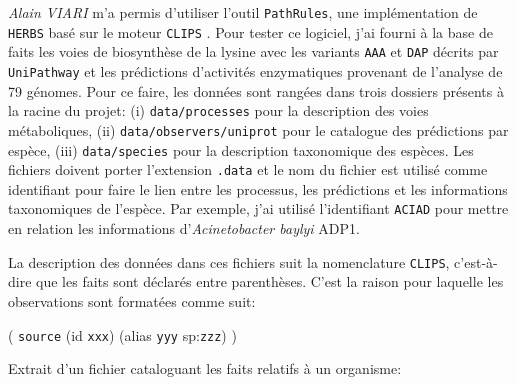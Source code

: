 \begin{refsegment}
\textit{Alain VIARI} m'a permis d'utiliser l'outil \texttt{PathRules}, une implémentation de \texttt{\gls{HERBS}} basé sur le moteur \texttt{\gls{CLIPS}} \cite{riley1991clips}. Pour tester ce logiciel, j'ai fourni à la base de faits les voies de biosynthèse de la lysine avec les variants \texttt{AAA} et \texttt{DAP} décrits par \texttt{UniPathway} et les prédictions d'activités enzymatiques provenant de l'analyse de 79 génomes. Pour ce faire, les données sont rangées dans trois dossiers présents à la racine du projet: (i) \texttt{data/processes} pour la description des voies métaboliques, (ii) \texttt{data/observers/uniprot} pour le catalogue des prédictions par espèce, (iii) \texttt{data/species} pour la description taxonomique des espèces. Les fichiers doivent porter l'extension \texttt{.data} et le nom du fichier est utilisé comme identifiant pour faire le lien entre les processus, les prédictions et les informations taxonomiques de l'espèce. Par exemple, j'ai utilisé l'identifiant \texttt{ACIAD} pour mettre en relation les informations d'\textit{Acinetobacter baylyi} ADP1.



La description des données dans ces fichiers suit la nomenclature \texttt{\gls{CLIPS}}, c'est-à-dire que les faits sont déclarés entre parenthèses. C'est la raison pour laquelle les observations sont formatées comme suit: 

( \texttt{source} (id \texttt{xxx}) (alias \texttt{yyy} sp:\texttt{zzz})  )

Extrait d'un fichier cataloguant les faits relatifs à un organisme:\nolisttopbreak




\end{refsegment}
